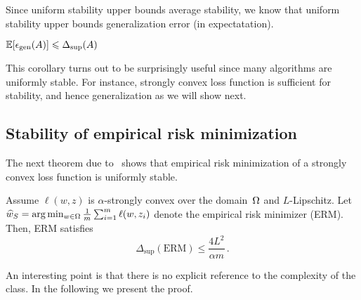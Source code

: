 Since uniform stability upper bounds average stability, we know that uniform
stability upper bounds generalization error (in expectatation).
%
\begin{corollary}
$\operatorname*{\mathbb{E}}[\epsilon_{\text{gen}}(A)] \leqslant \Delta_{\sup} (A)$
\end{corollary}

This corollary turns out to be surprisingly useful since many algorithms are
uniformly stable. For instance, strongly convex loss function is sufficient for
stability, and hence generalization as we will show next.

\subsection{Stability of empirical risk minimization}

The next theorem due to~\cite{Shalev2010LearnabilitySA} shows that empirical
risk minimization of a strongly convex loss function is uniformly stable.

\begin{theorem}
Assume $\ell(w, z)$ is $\alpha$-strongly convex over the domain~$\Omega$
and $L$-Lipschitz. 
Let $\widehat w_S = \arg \min_{w\in \Omega} \frac{1}{m} \sum_{i=1}^m \ell(w, z_i)$
denote the empirical risk minimizer (ERM).
Then, ERM satisfies
\begin{equation*}
\Delta_{\sup} (\text{ERM}) \leq \frac{4L^2}{\alpha m}\,.
\end{equation*}
\end{theorem}

An interesting point is that there is no explicit reference to the complexity of
the class. In the following we present the proof.

